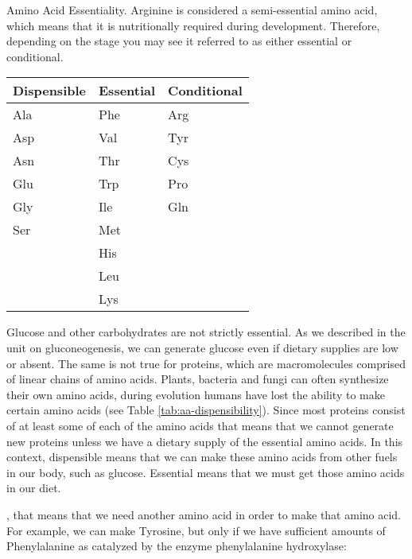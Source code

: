 \documentclass{tufte-handout}
\begin{document}
\begin{margintable}
\centering
\caption{Amino Acid Essentiality.  Arginine is considered a semi-essential amino acid, which means that it is nutritionally required during development.  Therefore, depending on the stage you may see it referred to as either essential or conditional.}
\label{tab:aa-dispensibility}
\begin{tabular}{lll}
\hline
\textbf {Dispensible} & \textbf{Essential} & \textbf{Conditional}\\
\hline
Ala & Phe & Arg\\
Asp & Val & Tyr\\
Asn & Thr & Cys\\
Glu & Trp & Pro\\
Gly & Ile & Gln\\
Ser & Met\\
 & His\\
 & Leu\\
 & Lys\\
\hline
\end{tabular}
\end{margintable}

Glucose and other carbohydrates are not strictly essential.  As we described in the unit on gluconeogenesis, we can generate glucose even if dietary supplies are low or absent.  The same is not true for proteins, which are macromolecules comprised of linear chains of amino acids.   Plants, bacteria and fungi can often synthesize their own amino acids, during evolution humans have lost the ability to make certain amino acids (see Table \ref{tab:aa-dispensibility}).  Since most proteins consist of at least some of each of the amino acids that means that we cannot generate new proteins unless we have a dietary supply of the essential amino acids.  In this context, dispensible means that we can make these amino acids from other fuels in our body, such as glucose.  Essential means that we must get those amino acids in our diet.  

, that means that we need another amino acid in order to make that amino acid.  For example, we can make Tyrosine, but only if we have sufficient amounts of Phenylalanine as catalyzed by the enzyme phenylalanine hydroxylase:
\end{document}
